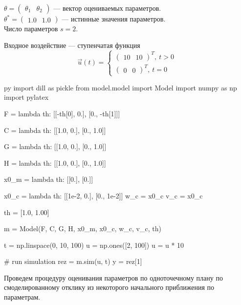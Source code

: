 \documentclass[a4paper,14pt]{extarticle}
\begin{document}
$\theta = \begin{pmatrix} \theta_1 & \theta_2 \end{pmatrix}$ --- вектор
	оцениваемых параметров. \\ 
\indent $\theta^{*} = \begin{pmatrix} 1.0 & 1.0 \end{pmatrix}$ --- истинные
	значения параметров. \\
\indent Число параметров $s = 2$.

Входное воздействие --- ступенчатая функция
\[
	\vec{u}(t) = \begin{cases} \begin{pmatrix} 10 & 10 \end{pmatrix}^T,\ t > 0 \\
		\begin{pmatrix} 0 & 0 \end{pmatrix}^T,\ t = 0 \end{cases}
\]

\begin{pythontexcustomcode}{py}
import dill as pickle
from model.model import Model
import numpy as np
import pylatex
\end{pythontexcustomcode}

\renewcommand{\baselinestretch}{1}

\begin{pycode}[model]
F = lambda th: [[-th[0], 0.],
                [0., -th[1]]]

C = lambda th: [[1.0, 0.],
                [0., 1.0]]

G = lambda th: [[1.0, 0.],
                [0., 1.0]]

H = lambda th: [[1.0, 0.],
                [0., 1.0]]

x0_m = lambda th: [[0.],
                   [0.]]

x0_c = lambda th: [[1e-2, 0.],
                   [0., 1e-2]]
w_c = x0_c
v_c = x0_c

th = [1.0, 1.00]

m = Model(F, C, G, H, x0_m, x0_c, w_c, v_c, th)
\end{pycode}

\begin{pycode}[model]
t = np.linspace(0, 10, 100)
u = np.ones([2, 100])
u = u * 10

# run simulation
rez = m.sim(u, t)
y = rez[1]
\end{pycode}

Проведем процедуру оценивания параметров по одноточечному плану по
смоделированному отклику из некоторого начального приближения по параметрам.
\end{document}
